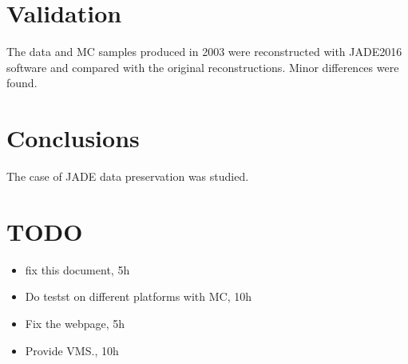 \section{Validation}
The data and MC samples produced in 2003 were reconstructed with JADE2016 software and compared with the 
original reconstructions. Minor differences were found.


\section{Conclusions}
The case of JADE data preservation was studied.

\section*{TODO}
\begin{itemize}
\item fix this document, 5h
\item Do testst on different platforms with MC, 10h
\item Fix the webpage, 5h
\item Provide VMS., 10h
\end{itemize}



